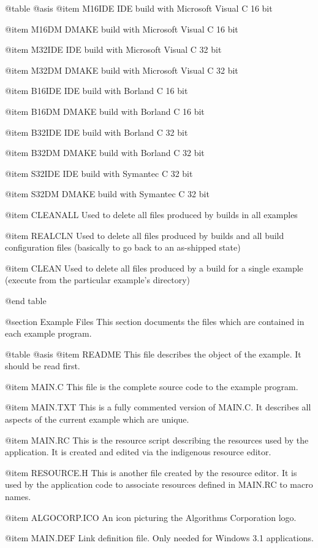 @table @asis
@item M16IDE
IDE build with Microsoft Visual C 16 bit

@item M16DM
DMAKE build with Microsoft Visual C 16 bit

@item M32IDE
IDE build with Microsoft Visual C 32 bit

@item M32DM
DMAKE build with Microsoft Visual C 32 bit

@item B16IDE
IDE build with Borland C 16 bit

@item B16DM
DMAKE build with Borland C 16 bit

@item B32IDE
IDE build with Borland C 32 bit

@item B32DM
DMAKE build with Borland C 32 bit

@item S32IDE
IDE build with Symantec C 32 bit

@item S32DM
DMAKE build with Symantec C 32 bit

@item CLEANALL
Used to delete all files produced by builds in all examples

@item REALCLN
Used to delete all files produced by builds and all build configuration
files (basically to go back to an as-shipped state)

@item CLEAN
Used to delete all files produced by a build for a single example
(execute from the particular example's directory)

@end table




@section Example Files
This section documents the files which are contained in each example
program.

@table @asis
@item README
This file describes the object of the example.  It should be read
first.

@item MAIN.C
This file is the complete source code to the example program.

@item MAIN.TXT
This is a fully commented version of MAIN.C.  It describes all aspects
of the current example which are unique.

@item MAIN.RC
This is the resource script describing the resources used by the application.
It is created and edited via the indigenous resource editor.

@item RESOURCE.H
This is another file created by the resource editor.  It is used by the
application code to associate resources defined in MAIN.RC to macro names.

@item ALGOCORP.ICO
An icon picturing the Algorithms Corporation logo.

@item MAIN.DEF
Link definition file.  Only needed for Windows 3.1 applications.

